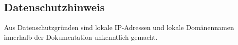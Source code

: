 \subsection{Datenschutzhinweis}
Aus Datenschutzgründen sind lokale IP-Adressen und lokale Domänennamen innerhalb der Dokumentation unkenntlich gemacht.